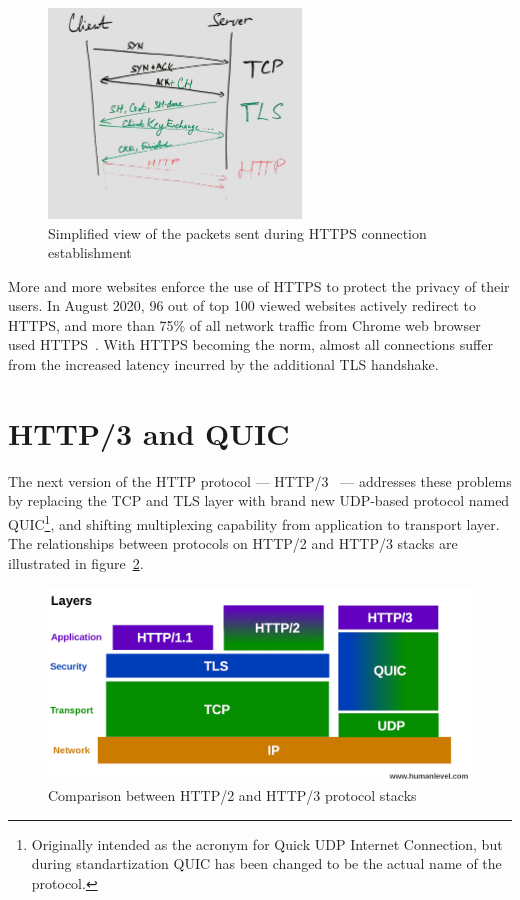 \begin{figure}[h]
  \centering
  \includegraphics[width=0.6\textwidth]{img/01-https-connection-packets}
  \caption{Simplified view of the packets sent during HTTPS connection establishment}\label{fig:https-packets}
\end{figure}

More and more websites enforce the use of HTTPS to protect the privacy of their users. In August
2020, 96 out of top 100 viewed websites actively redirect to HTTPS, and more than 75\% of all
network traffic from Chrome web browser used HTTPS~\cite{googleTransparency}. With HTTPS becoming
the norm, almost all connections suffer from the increased latency incurred by the additional TLS
handshake.

\section{HTTP/3 and QUIC}

The next version of the HTTP protocol --- HTTP/3~\cite{draft-ietf-quic-http-29} --- addresses these
problems by replacing the TCP and TLS layer with brand new UDP-based protocol named
QUIC\footnote{Originally intended as the acronym for Quick UDP Internet Connection, but during
standartization QUIC has been changed to be the actual name of the protocol.}, and shifting
multiplexing capability from application to transport layer. The relationships between protocols on
HTTP/2 and HTTP/3 stacks are illustrated in figure~\ref{fig:http2-vs-http3-stack}.

\begin{figure}[h]
  \centering
  \includegraphics[width=\textwidth]{img/01-pile-http-protocol}
  \caption{Comparison between HTTP/2 and HTTP/3 protocol stacks}\label{fig:http2-vs-http3-stack}
\end{figure}

